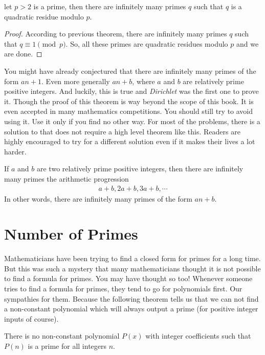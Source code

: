 \documentclass{subfiles}
\begin{document}
		\begin{theorem}
			let $p>2$ is a prime, then there are infinitely many primes $q$ such that $q$ is a quadratic residue modulo $p$.
		\end{theorem}

		\begin{proof}
			According to previous theorem, there are infinitely many primes $q$ such that $q \equiv 1 \pmod p$. So, all these primes are quadratic residues modulo $p$ and we are done.
		\end{proof}
	You might have already conjectured that there are infinitely many primes of the form $an+1$. Even more generally $an+b$, where $a$ and $b$ are relatively prime positive integers. And luckily, this is true and \textit{Dirichlet} was the first one to prove it. Though the proof of this theorem is way beyond the scope of this book. It is even accepted in many mathematics competitions. You should still try to avoid using it. Use it only if you find no other way. For most of the problems, there is a solution to that does not require a high level theorem like this. Readers are highly encouraged to try for a different solution even if it makes their  lives a lot harder.
		\begin{theorem}
			If $a$ and $b$ are two relatively prime positive integers, then there are infinitely many primes the arithmetic progression
				\begin{align*}
					a+b, 2a+b, 3a+b, \cdots
				\end{align*}
			In other words, there are infinitely many primes of the form $an+b$.
		\end{theorem}
	\section{Number of Primes}
		Mathematicians have been trying to find a closed form for primes for a long time. But this was such a mystery that many mathematicians thought it is not possible to find a formula for primes. You may have thought so too! Whenever someone tries to find a formula for primes, they tend to go for polynomials first. Our sympathies for them. Because the following theorem tells us that we can not find a non-constant polynomial which will always output a prime (for positive integer inputs of course).
			\begin{theorem}
				There is no non-constant polynomial $P(x)$ with integer coefficients such that $P(n)$ is a prime for all integers $n$.
			\end{theorem}
\end{document}
